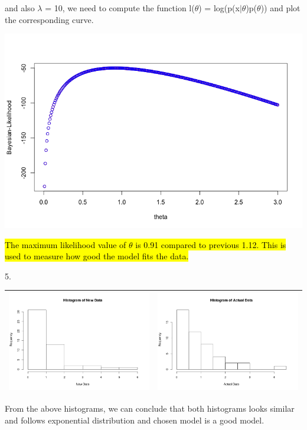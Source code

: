 \documentclass[a4paper,10pt]{article}
\begin{document}
and also $\lambda$ = 10, we need to compute the function l($\theta$) = log(p(x$|$$\theta$)p($\theta$)) and plot the corresponding
curve. \par
\begin{center}
	\includegraphics[width=.5\textwidth]{Bayesian.png}
\end{center}
\hl{The maximum likelihood value of $\theta$ is 0.91 compared to previous 1.12. This is used to measure how good the model fits the data.}
\par
\vspace{0.5cm}
5. \begin{center}
	\begin{tabular}{|c|c|}
		\hline
		\includegraphics[width=.5\textwidth]{Hist_New_Data.png}&
		\includegraphics[width=.5\textwidth]{Hist_Actual_Data.png}\\
		\hline
	\end{tabular}\par
\end{center} \par
From the above histograms, we can conclude that both histograms looks similar and follows exponential distribution and
chosen model is a good model.
$$
\end{document}
